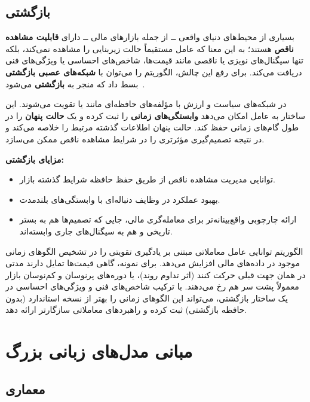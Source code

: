 \documentclass[12pt, a4paper]{report}
\begin{document}
\subsection{ بازگشتی\protect}

بسیاری از محیط‌های دنیای واقعی ــ از جمله بازارهای مالی ــ دارای \textbf{قابلیت مشاهده ناقص} هستند؛ به این معنا که عامل مستقیماً حالت زیربنایی را مشاهده نمی‌کند، بلکه تنها سیگنال‌های نویزی یا ناقصی مانند قیمت‌ها، شاخص‌های احساسی یا ویژگی‌های فنی دریافت می‌کند. برای رفع این چالش، الگوریتم  را می‌توان با \textbf{شبکه‌های عصبی بازگشتی} بسط داد که منجر به \textbf{ بازگشتی} می‌شود~\cite{heess2015memory_arxiv}.  

در  شبکه‌های سیاست و ارزش با مؤلفه‌های حافظه‌ای مانند  یا  تقویت می‌شوند. این ساختار به عامل امکان می‌دهد \textbf{وابستگی‌های زمانی} را ثبت کرده و یک \textbf{حالت پنهان} را در طول گام‌های زمانی حفظ کند. حالت پنهان اطلاعات گذشته مرتبط را خلاصه می‌کند و در نتیجه تصمیم‌گیری مؤثرتری را در شرایط مشاهده ناقص ممکن می‌سازد.  

\textbf{مزایای  بازگشتی:}
\begin{itemize}
    \item توانایی مدیریت مشاهده ناقص از طریق حفظ حافظه شرایط گذشته بازار.  
    \item بهبود عملکرد در وظایف دنباله‌ای با وابستگی‌های بلندمدت.  
    \item ارائه چارچوبی واقع‌بینانه‌تر برای معامله‌گری مالی، جایی که تصمیم‌ها هم به بستر تاریخی و هم به سیگنال‌های جاری وابسته‌اند.  
\end{itemize}

الگوریتم  توانایی عامل معاملاتی مبتنی بر یادگیری تقویتی را در تشخیص الگوهای زمانی موجود در داده‌های مالی افزایش می‌دهد. برای نمونه، گاهی قیمت‌ها تمایل دارند مدتی در همان جهت قبلی حرکت کنند (اثر تداوم روند)، یا دوره‌های پرنوسان و کم‌نوسان بازار معمولاً پشت سر هم رخ می‌دهند. با ترکیب شاخص‌های فنی و ویژگی‌های احساسی در یک ساختار بازگشتی،  می‌تواند این الگوهای زمانی را بهتر از نسخه استاندارد  (بدون حافظه بازگشتی) ثبت کرده و راهبردهای معاملاتی سازگارتر ارائه دهد.


\section{مبانی مدل‌های زبانی بزرگ}

\subsection{معماری }
\end{document}
